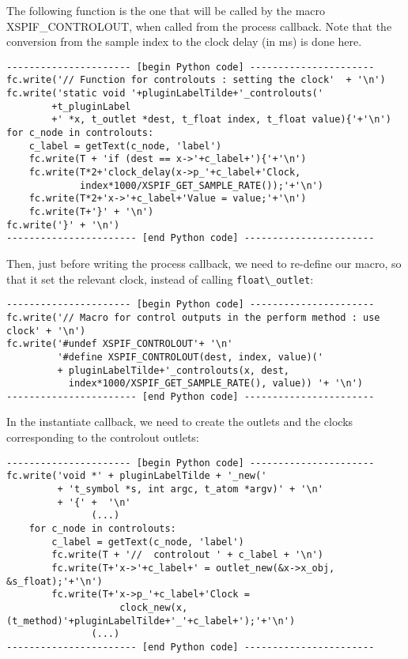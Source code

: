 \noindent The following function is the one that will be called by the macro
XSPIF\_CONTROLOUT, when called from the process callback. Note that the 
conversion from the sample index to the clock delay (in ms) is done here.

\begin{verbatim}
---------------------- [begin Python code] ----------------------
fc.write('// Function for controlouts : setting the clock'  + '\n')
fc.write('static void '+pluginLabelTilde+'_controlouts('
        +t_pluginLabel
        +' *x, t_outlet *dest, t_float index, t_float value){'+'\n')
for c_node in controlouts:
    c_label = getText(c_node, 'label')
    fc.write(T + 'if (dest == x->'+c_label+'){'+'\n')
    fc.write(T*2+'clock_delay(x->p_'+c_label+'Clock, 
             index*1000/XSPIF_GET_SAMPLE_RATE());'+'\n')
    fc.write(T*2+'x->'+c_label+'Value = value;'+'\n')
    fc.write(T+'}' + '\n')
fc.write('}' + '\n')
----------------------- [end Python code] -----------------------
\end{verbatim}

\noindent Then, just before writing the process callback, we need to re-define 
our macro, so that it set the relevant clock, instead of calling \verb|float\_outlet|:

\begin{verbatim}
---------------------- [begin Python code] ----------------------
fc.write('// Macro for control outputs in the perform method : use clock' + '\n')
fc.write('#undef XSPIF_CONTROLOUT'+ '\n'
         '#define XSPIF_CONTROLOUT(dest, index, value)('
         + pluginLabelTilde+'_controlouts(x, dest,
           index*1000/XSPIF_GET_SAMPLE_RATE(), value)) '+ '\n')
----------------------- [end Python code] -----------------------
\end{verbatim}

\noindent In the instantiate callback, we need to create the outlets 
and the clocks corresponding to the controlout outlets:

\begin{verbatim}
---------------------- [begin Python code] ----------------------
fc.write('void *' + pluginLabelTilde + '_new('
         + 't_symbol *s, int argc, t_atom *argv)' + '\n'
         + '{' +  '\n'
               (...)
    for c_node in controlouts:
        c_label = getText(c_node, 'label')
        fc.write(T + '//  controlout ' + c_label + '\n')
        fc.write(T+'x->'+c_label+' = outlet_new(&x->x_obj,  &s_float);'+'\n')
        fc.write(T+'x->p_'+c_label+'Clock = 
                    clock_new(x, (t_method)'+pluginLabelTilde+'_'+c_label+');'+'\n')
               (...)
----------------------- [end Python code] -----------------------
\end{verbatim}


